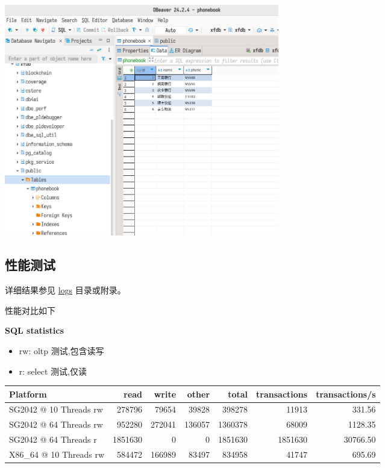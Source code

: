 \documentclass{article}
\begin{document}
\begin{center}
\includegraphics[width=12cm]{./image/6.png}
\end{center}

\subsection{性能测试}

详细结果参见 \href{https://github.com/QA-Team-lo/dbtest/tree/main/opengauss/logs}{logs} 目录或附录。

性能对比如下

\textbf{SQL statistics}

\begin{itemize}
    \item rw: oltp 测试,包含读写 
    \item r: select 测试,仅读
\end{itemize}

\begin{table}[h!]
\centering
\begin{tabular}{|l|r|r|r|r|r|r|}
\hline
Platform & read & write & other & total & transactions & transactions/s \\
\hline
SG2042 @ 10 Threads rw & 278796 & 79654 & 39828 & 398278 & 11913 & 331.56 \\
SG2042 @ 64 Threads rw & 952280 & 272041 & 136057 & 1360378 & 68009 & 1128.35 \\
SG2042 @ 64 Threads r  & 1851630 & 0      & 0      & 1851630 & 1851630 & 30766.50 \\
X86\_64 @ 10 Threads rw & 584472 & 166989 & 83497 & 834958 & 41747 & 695.69 \\
\hline
\end{tabular}
\end{table}
\end{document}
